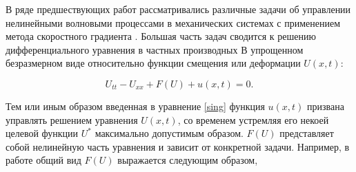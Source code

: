 
В ряде предшествующих работ \cite{porant16, porant17, PorubovAntonov2018mechSystem} рассматривались различные задачи об управлении нелинейными волновыми процессами в механических системах с применением метода скоростного градиента \cite{fradkov_rus_speed_grad}. Большая часть задач сводится к решению дифференциального уравнения в частных производных В упрощенном безразмерном виде относительно функции смещения или деформации $U(x,t)$:

\begin{equation}
	U_{tt}-U_{xx}+F\left(U\right)+u(x,t)=0.
	\label{sing}
\end{equation}

Тем или иным образом введенная в уравнение \eqref{sing} функция $u(x,t)$ призвана управлять решением уравнения $U(x,t)$, со временем устремляя его некоей целевой функции $U^*$ максимально допустимым образом. $F\left(U\right)$ представляет собой нелинейную часть уравнения и зависит от конкретной задачи. Например, в работе \cite{porant16} общий вид  $F\left(U\right)$ выражается следующим образом,

